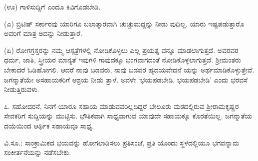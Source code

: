 (ಊ) ಗಾಳಿಸುದ್ದಿಗೆ ಎಂದೂ ಕಿವಿಗೊಡಬೇಡಿ.

(ಎ) ಬ್ರಿಟಿಷ್ ಸರ್ಕಾರವು ಯಾರಿಗೂ ಬಲಾತ್ಕಾರವಾಗಿ ಚುಚ್ಚುಮದ್ದನ್ನು ನೀಡು ವುದಿಲ್ಲ. ಯಾರು ಇಷ್ಟಪಡುತ್ತಾರೊ ಅವರಿಗೆ ಮಾತ್ರ ಅದನ್ನು ನೀಡುತ್ತಾರೆ.

(ಏ) ರೋಗಗ್ರಸ್ತರನ್ನು ನಮ್ಮ ಆಸ್ಪತ್ರೆಗಳಲ್ಲಿ ನೋಡಿಕೊಳ್ಳಲು ಎಲ್ಲ ಪ್ರಯತ್ನ ವನ್ನೂ ಮಾಡಲಾಗುತ್ತದೆ. ಅವರವರ ಧರ್ಮ, ಜಾತಿ, ಸ್ತ್ರೀಯರ ಮಾನ್ಯತೆ ಇವುಗಳಿ ಗಾವುದಕ್ಕೂ ಭಂಗವಾಗದಂತೆ ನೋಡಿಕೊಳ್ಳಲಾಗುತ್ತದೆ. ಶ‍್ರೀಮಂತರು ಬೇಕಾದರೆ ಓಡಿಹೋಗಲಿ. ಆದರೆ ನಾವು ಬಡವರು, ನಾವು ಬಡವರ ಹೃದಯವೇದನೆ ಯನ್ನು ಅರ್ಥಮಾಡಿಕೊಳ್ಳುತ್ತೇವೆ. ಜಗನ್ಮಾತೆಯೇ ಅಸಹಾಯಕರಿಗೆ ಆಶ್ರಯ ನೀಡು ತ್ತಾಳೆ. ಅವಳೇ ‘ಭಯಪಡಬೇಡಿ, ಭಯಪಡಬೇಡಿ’ ಎಂದು ಭರವಸೆ ನೀಡುತ್ತಿರುವಳು.

೭. ಸಹೋದರನೆ, ನಿನಗೆ ಯಾರೂ ಸಹಾಯ ಮಾಡುವವರಿಲ್ಲದಿದ್ದರೆ ಬೇಲೂರು ಮಠದಲ್ಲಿರುವ ಶ‍್ರೀರಾಮಕೃಷ್ಣರ ಸೇವಕರಿಗೆ ಸುದ್ದಿಯನ್ನು ಮುಟ್ಟಿಸು. ಭೌತಿಕವಾಗಿ ಸಾಧ್ಯವಾಗುವ ಯಾವುದೇ ಸಹಾಯಕ್ಕೂ ಕೊರತೆಯಿಲ್ಲ. ಜಗನ್ಮಾತೆಯ ದಯೆಯಿಂದ ಆರ್ಥಿಕ ಸಹಾಯವೂ ಸಾಧ್ಯ.

ವಿ.ಸೂ.: ಸಾಂಕ್ರಾಮಿಕದ ಭಯವನ್ನು ಹೋಗಲಾಡಿಸಲು ಪ್ರತಿಸಂಜೆ, ಪ್ರತಿ ಯೊಂದು ಸ್ಥಳದಲ್ಲಿಯೂ ಭಗವನ್ನಾಮ ಸಂಕೀರ್ತನೆಯನ್ನು ನಡೆಸಬೇಕು.

